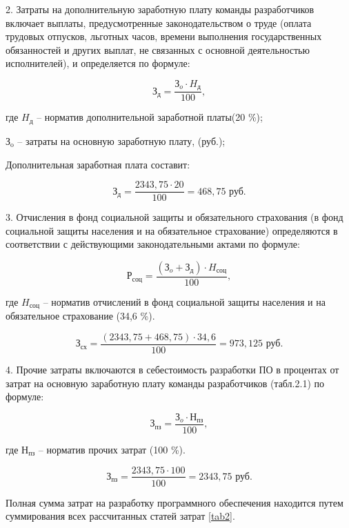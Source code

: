2. Затраты на дополнительную заработную плату команды разработчиков включает выплаты, предусмотренные законодательством о труде (оплата трудовых отпусков, льготных часов, времени выполнения государственных обязанностей и других выплат, не связанных с основной деятельностью исполнителей), и определяется по формуле:

\begin{equation}
    \text{З}_{\text{д}} = \frac{\text{З}_{o}\cdot H_\text{д}}{100},
\end{equation}


где $H_\text{д}$ -- норматив дополнительной              заработной платы(20 \%);

   $\text{З}_{\text{o}}$ -- затраты на основную заработную плату, (руб.);




Дополнительная заработная плата составит:

$$
\text{З}_{\text{д}} = \frac{2343,75 \cdot 20}{100} = 468,75 \text{ руб}.
$$

3. Отчисления в фонд социальной защиты и обязательного страхования (в фонд социальной защиты населения и на обязательное страхование) определяются в соответствии с действующими законодательными актами по формуле:

\begin{equation}
    \text{Р}_{\text{соц}} = \frac{(\text{З}_{o} + \text{З}_{\text{д}})\cdot H_\text{соц}}{100},
\end{equation}

где $H_\text{соц}$ -- норматив отчислений в фонд социальной защиты населения и на обязательное страхование (34,6 \%).

$$
 \text{З}_{\text{сх}} = \frac{(2343,75 + 468,75)\cdot 34,6}{100} = 973,125 \text{ руб}.
$$

4. Прочие затраты включаются в себестоимость разработки ПО в процентах от затрат на основную заработную плату команды разработчиков (табл.2.1) по формуле:

\begin{equation}
    \text{З}_{\text{пз}} = \frac{\text{З}_{o} \cdot \text{Н}_{\text{пз}}}{100},
\end{equation}

где $\text{Н}_{\text{пз}}$ -- норматив прочих затрат (100 \%).

$$
 \text{З}_{\text{пз}} = \frac{2343,75 \cdot 100}{100} = 2343,75 \text{ руб}.
$$

Полная сумма затрат на разработку программного обеспечения находится
путем суммирования всех рассчитанных статей затрат \ref{tab2}.

